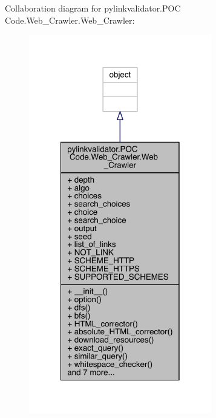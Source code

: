 Collaboration diagram for pylinkvalidator.\+P\+OC Code.\+Web\+\_\+\+Crawler.\+Web\+\_\+\+Crawler\+:
\nopagebreak
\begin{figure}[H]
\begin{center}
\leavevmode
\includegraphics[width=226pt]{classpylinkvalidator_1_1_p_o_c_01_code_1_1_web___crawler_1_1_web___crawler__coll__graph}
\end{center}
\end{figure}
